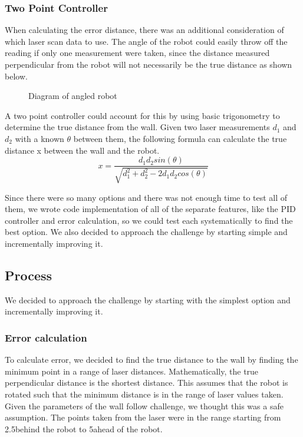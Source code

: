 \documentclass[journal, a4paper]{IEEEtran}
\begin{document}
\subsubsection{Two Point Controller}
When calculating the error distance, there was an additional consideration of which laser scan data to use. The angle of the robot could easily throw off the reading if only one measurement were taken, since the distance measured perpendicular from the robot will not necessarily be the true distance as shown below. \\ 
\begin{figure}[H]
\centering
{}
\caption{Diagram of angled robot}
\end{figure}
A two point controller could account for this by using basic trigonometry to determine the true distance from the wall. Given two laser measurements $d_1$ and $d_2$ with a known $\theta$ between them, the following formula can calculate the true distance x between the wall and the robot.  
\begin{equation}
x = \frac{d_1d_2sin(\theta)}{\sqrt{d_1^2+d_2^2-2d_1d_2cos(\theta)}}
\end{equation}
\par Since there were so many options and there was not enough time to test all of them, we wrote code implementation of all of the separate features, like the PID controller and error calculation, so we could test each systematically to find the best option. We also decided to approach the challenge by starting simple and incrementally improving it.
\subsection{Process}
We decided to approach the challenge by starting with the simplest option and incrementally improving it.
\subsubsection{Error calculation}To calculate error, we decided to find the true distance to the wall by finding the minimum point in a range of laser distances. Mathematically, the true perpendicular distance is the shortest distance. This assumes that the robot is rotated such that the minimum distance is in the range of laser values taken. Given the parameters of the wall follow challenge, we thought this was a safe assumption. The points taken from the laser were in the range starting from 2.5\degree behind the robot to 5\degree  ahead of the robot.
\end{document}

